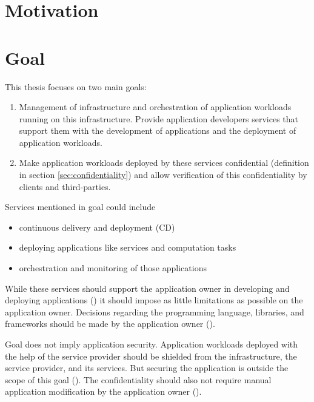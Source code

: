 
\section{Motivation}
\label{sec:motivation}

\section{Goal}
\label{sec:goal}


This thesis focuses on two main goals:

\begin{enumerate}[label=\textbf{\Roman*}]
  \item Management of infrastructure and orchestration of application workloads
  running on this infrastructure. Provide application developers services that
  support them with the development of applications and the deployment of
  application workloads.
  \item Make application workloads deployed by these services confidential
  (definition in section \ref{sec:confidentiality}) and allow verification of
  this confidentiality by clients and third-parties.
\end{enumerate}

Services mentioned in goal  could include
\begin{itemize}
  \item continuous delivery and deployment (CD)
  \item deploying applications like services and computation tasks
  \item orchestration and monitoring of those applications
\end{itemize}
While these services should support the application owner in developing and
deploying applications () it should impose as little
limitations as possible on the application owner. Decisions regarding the
programming language, libraries, and frameworks should be made by the
application owner ().

Goal  does not imply application security. Application workloads
deployed with the help of the service provider should be shielded from the
infrastructure, the service provider, and its services. But securing the
application is outside the scope of this goal (). The
confidentiality should also not require manual application modification by the
application owner ().


